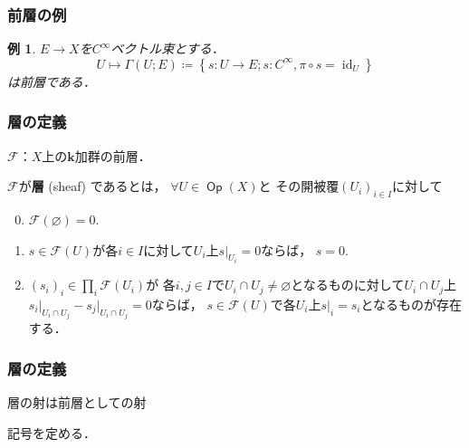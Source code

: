 \documentclass[dvipdfmx,12pt,aspectratio=169,leqno]{beamer}%
\newcommand{\kk}{\mathbf{k}}
\newcommand{\Ab}{{\bf Ab}}
\newcommand{\Mod}{\mathop{\mathrm{Mod}}\nolimits}
\numberwithin{equation}{subsection}
\newcommand{\Op}{\mathop{\textsf{Op}}\nolimits}
\newcommand{\id}{\mathop{\mathrm{id}}\nolimits}
\newcommand{\Sh}{\mathrm{Sh}}
\newcommand{\PSh}{\mathrm{PSh}}
\theoremstyle{mystyle}
\newtheorem{EG}[AXM]{例}
\begin{document}
\begin{frame}
    \frametitle{前層の例}
    \begin{EG}
        \(E\to X\)を\(C^{\infty}\)ベクトル束とする．
        \[
            U\mapsto \Gamma(U;E)\coloneqq
            \left\{s\colon U\to E;s\colon C^{\infty},\pi\circ s=\id_U\right\}
        \]は前層である．
    \end{EG}
\end{frame}

\begin{frame}
    \frametitle{層の定義}
    \begin{definition}[層]\label{def:sheaf}
        \(\mathscr{F}\)：\(X\)上の\(\kk\)加群の前層．
        
        \(\mathscr{F}\)が\textbf{層} (sheaf) であるとは，
        \(\forall U\in\Op(X)\)と
        その開被覆\(\left(U_i\right)_{i\in I}\)に対して
        \begin{enumerate}[(S1)]
            \setcounter{enumi}{-1}
            \item \(\mathscr{F}(\varnothing)=0\).
            \item \(s\in\mathscr{F}(U)\)が各\(i\in I\)に対して\(U_i\)上\(s\rvert_{U_{i}}=0\)ならば，
            \(s=0\).\label{sheaf-cond1}
            \item \(\left(s_i\right)_i\in\prod_{i}\mathscr{F}(U_i)\)が
            各\(i,j\in I\)で\(U_i\cap U_j\ne\varnothing\)となるものに対して\(U_i\cap U_j\)上\(s_i\rvert_{U_i\cap U_j}-s_j\rvert_{U_i\cap U_j}=0\)ならば，
            \(s\in\mathscr{F}(U)\)で各\(U_i\)上\(s\rvert_i=s_i\)となるものが存在する．\label{sheaf-cond2}
        \end{enumerate}
    \end{definition}    
\end{frame}

\begin{frame}
    \frametitle{層の定義}
    層の射は前層としての射

    \bigskip
    記号を定める．
\end{frame}
\end{document}
